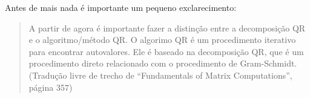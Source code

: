 % 
% 
% 
% 
%
% 
%
%
Antes de mais nada \'{e} importante um pequeno exclarecimento:
\begin{quote}
    A partir de agora \'{e} importante fazer a distin\c{c}\~{a}o entre a decomposi\c{c}\~{a}o QR e o algoritmo/m\'{e}todo QR. O algorimo QR \'{e} um procedimento iterativo para encontrar autovalores. Ele \'{e} baseado na decomposi\c{c}\~{a}o QR, que \'{e} um procedimento direto relacionado com o procedimento de Gram-Schmidt. (Tradu\c{c}\~{a}o livre de trecho de ``Fundamentals of Matrix Computations''\nocite{Watkins:2004:fundamentals}, p\'{a}gina 357)
\end{quote}
